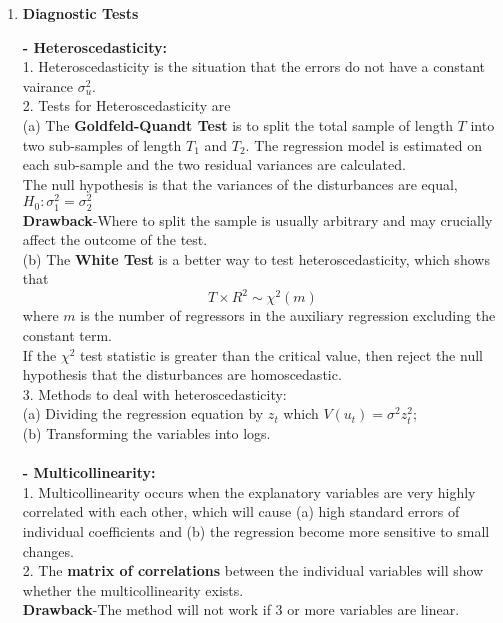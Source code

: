 \documentclass{article}
\begin{document}
\begin{enumerate}[S1 - ]
    \item \textbf{Diagnostic Tests}\\\par
    \textbf{- Heteroscedasticity:}\\
    1. Heteroscedasticity is the situation that the errors do not have a constant vairance $\sigma_u^2$.\\
    2. Tests for Heteroscedasticity are\\
    (a) The \textbf{Goldfeld-Quandt Test} is to split the total sample of length $T$ into two sub-samples of length $T_1$ and $T_2$. The regression model is estimated on each sub-sample and the two residual variances are calculated.\\
    The null hypothesis is that the variances of the disturbances are equal, $H_0: \sigma_1^2 = \sigma_2^2$\\
    \textbf{Drawback}-Where to split the sample is usually arbitrary and may crucially affect the outcome of the test.\\
    (b) The \textbf{White Test} is a better way to test heteroscedasticity, which shows that
    \begin{equation*}
    T \times R^2 \sim \chi^2(m)
    \end{equation*}
    where $m$ is the number of regressors in the auxiliary regression excluding the constant term.\\
    If the $\chi^2$ test statistic is greater than the critical value, then reject the null hypothesis that the disturbances are homoscedastic.\\
    3. Methods to deal with heteroscedasticity:\\
    (a) Dividing the regression equation by $z_t$ which $V(u_t) = \sigma^2z_t^2$;\\
    (b) Transforming the variables into logs.\\
    \\
    \textbf{- Multicollinearity:}\\
    1. Multicollinearity occurs when the explanatory variables are very highly correlated with each other, which will cause (a) high standard errors of individual coefficients and (b) the regression become more sensitive to small changes.\\
    2. The \textbf{matrix of correlations} between the individual variables will show whether the multicollinearity exists.\\
    \textbf{Drawback}-The method will not work if 3 or more variables are linear.\\

\end{enumerate}
\end{document}

